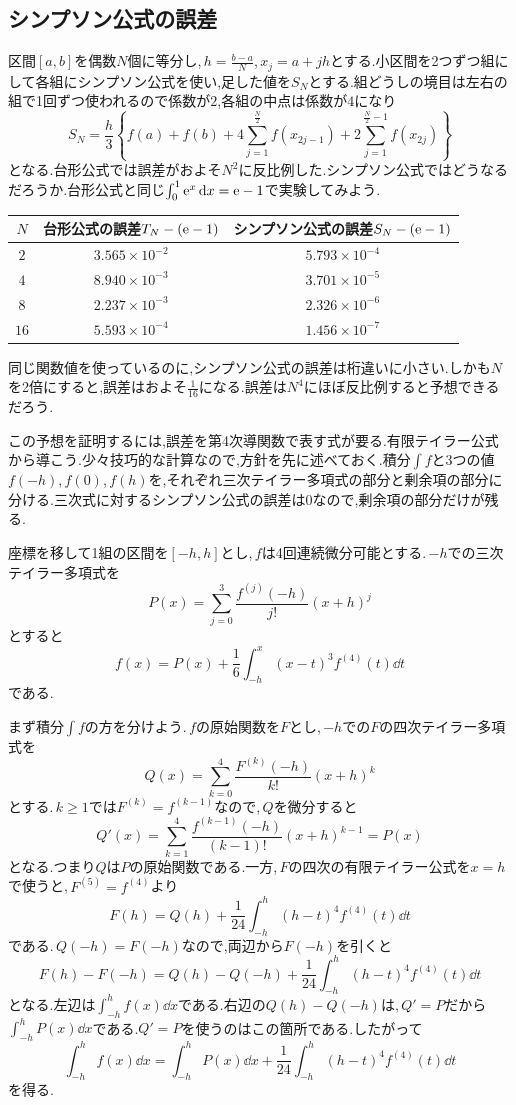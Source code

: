 \subsection{シンプソン公式の誤差}

区間$[a,b]$を偶数$N$個に等分し,\,$h=\frac{b-a}{N}$,\,$x_j=a+jh$とする.小区間を2つずつ組にして各組にシンプソン公式を使い,足した値を$S_N$とする.組どうしの境目は左右の組で1回ずつ使われるので係数が$2$,各組の中点は係数が$4$になり
\[
 S_N=\frac h3\left\{f(a)+f(b)
 +4\sum_{j=1}^{\frac N2}f(x_{2j-1})
 +2\sum_{j=1}^{\frac N2-1}f(x_{2j})\right\}
\]
となる.台形公式では誤差がおよそ$N^2$に反比例した.シンプソン公式ではどうなるだろうか.台形公式と同じ$\int_0^1\mathrm{e}^x\,\mathrm{d} x=\mathrm{e}-1$で実験してみよう.
\begin{center}
\begin{tabular}{ccc}
\toprule
$N$ & 台形公式の誤差$T_N-(\mathrm{e}-1)$ & シンプソン公式の誤差$S_N-(\mathrm{e}-1)$\\
\midrule
$2$ & $3.565\times10^{-2}$ & $5.793\times10^{-4}$\\
$4$ & $8.940\times10^{-3}$ & $3.701\times10^{-5}$\\
$8$ & $2.237\times10^{-3}$ & $2.326\times10^{-6}$\\
$16$ & $5.593\times10^{-4}$ & $1.456\times10^{-7}$\\
\bottomrule
\end{tabular}
\end{center}
同じ関数値を使っているのに,シンプソン公式の誤差は桁違いに小さい.しかも$N$を2倍にすると,誤差はおよそ$\frac1{16}$になる.誤差は$N^4$にほぼ反比例すると予想できるだろう.

この予想を証明するには,誤差を第4次導関数で表す式が要る.有限テイラー公式から導こう.少々技巧的な計算なので,方針を先に述べておく.積分$\int f$と3つの値$f(-h)$,\,$f(0)$,\,$f(h)$を,それぞれ三次テイラー多項式の部分と剰余項の部分に分ける.三次式に対するシンプソン公式の誤差は$0$なので,剰余項の部分だけが残る.

座標を移して1組の区間を$[-h,h]$とし,\,$f$は4回連続微分可能とする.\,$-h$での三次テイラー多項式を
\[
 P(x)=\sum_{j=0}^{3}\frac{f^{(j)}(-h)}{j!}(x+h)^j
\]
とすると
\[
 f(x)=P(x)+\frac16\int_{-h}^x(x-t)^3f^{(4)}(t)\dd t
\]
である.

まず積分$\int f$の方を分けよう.\,$f$の原始関数を$F$とし,\,$-h$での$F$の四次テイラー多項式を
\[
 Q(x)=\sum_{k=0}^{4}\frac{F^{(k)}(-h)}{k!}(x+h)^k
\]
とする.\,$k\ge1$では$F^{(k)}=f^{(k-1)}$なので,\,$Q$を微分すると
\[
 Q'(x)=\sum_{k=1}^{4}\frac{f^{(k-1)}(-h)}{(k-1)!}(x+h)^{k-1}=P(x)
\]
となる.つまり$Q$は$P$の原始関数である.一方,\,$F$の四次の有限テイラー公式を$x=h$で使うと,\,$F^{(5)}=f^{(4)}$より
\[
 F(h)=Q(h)+\frac1{24}\int_{-h}^h(h-t)^4f^{(4)}(t)\dd t
\]
である.\,$Q(-h)=F(-h)$なので,両辺から$F(-h)$を引くと
\[
 F(h)-F(-h)=Q(h)-Q(-h)+\frac1{24}\int_{-h}^h(h-t)^4f^{(4)}(t)\dd t
\]
となる.左辺は$\int_{-h}^hf(x)\dd x$である.右辺の$Q(h)-Q(-h)$は,\,$Q'=P$だから$\int_{-h}^hP(x)\dd x$である.$Q'=P$を使うのはこの箇所である.したがって
\[
 \int_{-h}^hf(x)\dd x
 =\int_{-h}^hP(x)\dd x
  +\frac1{24}\int_{-h}^h(h-t)^4f^{(4)}(t)\dd t
\]
を得る.

